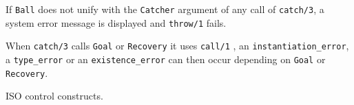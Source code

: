 If \texttt{Ball} does not unify with the \texttt{Catcher} argument of
any call of \texttt{catch/3}, a system error message is displayed and
\texttt{throw/1} fails.

When \texttt{catch/3} calls \texttt{Goal} or \texttt{Recovery} it uses \texttt{call/1}
, an \texttt{instantiation\_error}, a \texttt{type\_error}
or an \texttt{existence\_error} can then occur depending on
\texttt{Goal} or \texttt{Recovery}.

\Portability

ISO control constructs.


